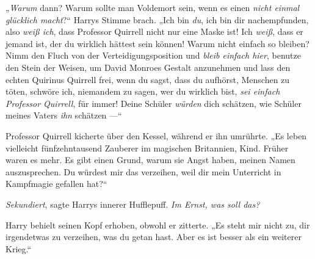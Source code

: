 „\emph{Warum} dann? Warum sollte man Voldemort sein, wenn es einen \emph{nicht einmal glücklich macht}?“
Harrys Stimme brach.
„Ich bin \emph{du}, ich bin dir nachempfunden, also \emph{weiß ich}, dass Professor Quirrell nicht nur eine Maske ist! Ich \emph{weiß}, dass er jemand ist, der du wirklich hättest sein können! Warum nicht einfach so bleiben? Nimm den Fluch von der Verteidigungsposition und \emph{bleib einfach hier}, benutze den Stein der Weisen, um David Monroes Gestalt anzunehmen und lass den echten Quirinus Quirrell frei, wenn du sagst, dass du aufhörst, Menschen zu töten, schwöre ich, niemandem zu sagen, wer du wirklich bist, \emph{sei einfach Professor Quirrell}, für immer! Deine Schüler \emph{würden} dich schätzen, wie Schüler meines Vaters \emph{ihn} schätzen —“

Professor Quirrell kicherte über den Kessel, während er ihn umrührte.
„Es leben vielleicht fünfzehntausend Zauberer im magischen Britannien, Kind. Früher waren es mehr. Es gibt einen Grund, warum sie Angst haben, meinen Namen auszusprechen. Du würdest mir das verzeihen, weil dir mein Unterricht in Kampfmagie gefallen hat?“

\emph{Sekundiert}, sagte Harrys innerer Hufflepuff. \emph{Im Ernst, was soll das?}

Harry behielt seinen Kopf erhoben, obwohl er zitterte.
„Es steht mir nicht zu, dir irgendetwas zu verzeihen, was du getan hast. Aber es ist besser als ein weiterer Krieg.“


